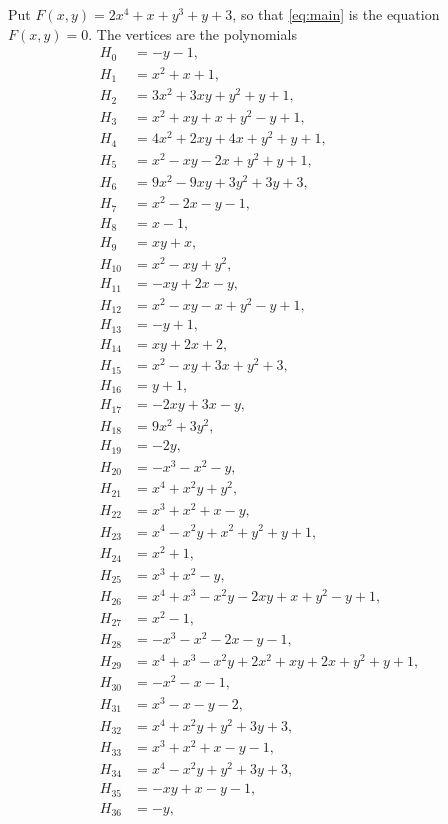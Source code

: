 \documentclass[11pt]{article}
\begin{document}
Put $F(x,y)=2x^{4}+x+y^{3}+y+3$, so that \eqref{eq:main} is the equation $F(x,y)=0$. The vertices are the polynomials
\begin{align*}
H_{0}&=-y-1,\\
H_{1}&=x^{2}+x+1,\\
H_{2}&=3x^{2}+3xy+y^{2}+y+1,\\
H_{3}&=x^{2}+xy+x+y^{2}-y+1,\\
H_{4}&=4x^{2}+2xy+4x+y^{2}+y+1,\\
H_{5}&=x^{2}-xy-2x+y^{2}+y+1,\\
H_{6}&=9x^{2}-9xy+3y^{2}+3y+3,\\
H_{7}&=x^{2}-2x-y-1,\\
H_{8}&=x-1,\\
H_{9}&=xy+x,\\
H_{10}&=x^{2}-xy+y^{2},\\
H_{11}&=-xy+2x-y,\\
H_{12}&=x^{2}-xy-x+y^{2}-y+1,\\
H_{13}&=-y+1,\\
H_{14}&=xy+2x+2,\\
H_{15}&=x^{2}-xy+3x+y^{2}+3,\\
H_{16}&=y+1,\\
H_{17}&=-2xy+3x-y,\\
H_{18}&=9x^{2}+3y^{2},\\
H_{19}&=-2y,\\
H_{20}&=-x^{3}-x^{2}-y,\\
H_{21}&=x^{4}+x^{2}y+y^{2},\\
H_{22}&=x^{3}+x^{2}+x-y,\\
H_{23}&=x^{4}-x^{2}y+x^{2}+y^{2}+y+1,\\
H_{24}&=x^{2}+1,\\
H_{25}&=x^{3}+x^{2}-y,\\
H_{26}&=x^{4}+x^{3}-x^{2}y-2xy+x+y^{2}-y+1,\\
H_{27}&=x^{2}-1,\\
H_{28}&=-x^{3}-x^{2}-2x-y-1,\\
H_{29}&=x^{4}+x^{3}-x^{2}y+2x^{2}+xy+2x+y^{2}+y+1,\\
H_{30}&=-x^{2}-x-1,\\
H_{31}&=x^{3}-x-y-2,\\
H_{32}&=x^{4}+x^{2}y+y^{2}+3y+3,\\
H_{33}&=x^{3}+x^{2}+x-y-1,\\
H_{34}&=x^{4}-x^{2}y+y^{2}+3y+3,\\
H_{35}&=-xy+x-y-1,\\
H_{36}&=-y,\\

\end{align*}
\end{document}
